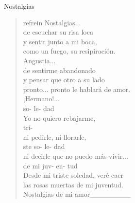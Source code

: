\begin{song}[tango]{Nostalgias}
\begin{verse}{refrein}
	Nostalgias...\\
	de escuchar su risa loca\\
	y sentir junto a mi boca,\\
	como un fuego, su resipiración.\\
	Angustia...\\
	\chord{---}de sentirme abandonado\\
	y pensar que otro a su lado\\
	pronto... pronto le hablará de amor.\\
	¡Hermano!...   \chord{---}\\
	\hspace*{2.8em} so- le- dad\\
	Yo no quiero rebajarme,\\
	\hspace*{5.8em}tri-\\
	 ni pedirle, ni llorarle,\\
	\hspace*{2.\wlskip} ste so- le- dad\\
	ni decirle que no puedo más vivir...\\
	\hspace*{3em} de\hspace{0.5em} mi\hspace{\wlskip} juv- en- tud\\
	Desde mi triste soledad, veré caer\\
	las rosas muertas de mi juventud.\hspace{1em}\hspace{2.9em}\hspace{1.5em}\hspace{1.7em}\\
	\hspace*{13em} Nostalgias   de mi amor\_\_\_\_\_\_\_\_

\end{verse}
\end{song}


